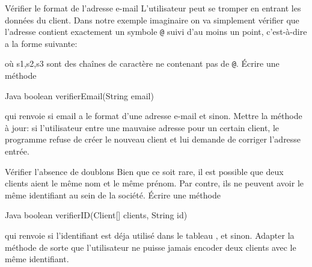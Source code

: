 \documentclass[a4paper,11pt]{article}
\begin{document}
\begin{Exercice}{V\'erifier le format de l'adresse e-mail}
		L'utilisateur peut se tromper en entrant les donn\'ees du client. Dans notre exemple imaginaire on va simplement v\'erifier que l'adresse contient exactement un symbole \texttt{@} suivi 	d'au moins un point, c'est-à-dire a la forme suivante:
		
	         \begin{center}
                \end{center}
		
		o\`u s1,s2,s3 sont des cha\^ines de caract\`ere ne contenant pas de \texttt{@}. \'Ecrire une m\'ethode 
		
		\begin{Code}{Java}
		boolean verifierEmail(String email)
		\end{Code}
		
		qui renvoie  si email a le format d'une adresse e-mail et  sinon.
		Mettre la m\'ethode  \`a jour: si l'utilisateur entre une mauvaise adresse pour un certain client, le programme refuse de cr\'eer le nouveau client et lui demande de corriger      l'adresse entr\'ee.
	\end{Exercice}


\begin{Exercice}{V\'erifier l'absence de doublons}
		Bien que ce soit rare, il est possible que deux clients aient le m\^eme nom et le m\^eme pr\'enom. Par contre, ils ne peuvent avoir le m\^eme identifiant au sein de la soci\'et\'e. \'Ecrire une m\'ethode
		
		\begin{Code}{Java}
		boolean verifierID(Client[] clients, String id)
		\end{Code}
		
qui renvoie  si l'identifiant  est d\'eja utilis\'e dans le tableau , et  sinon. Adapter la m\'ethode  de sorte que l'utilisateur ne puisse jamais encoder deux clients avec le m\^eme identifiant. 

\end{Exercice}
	
\end{document}
